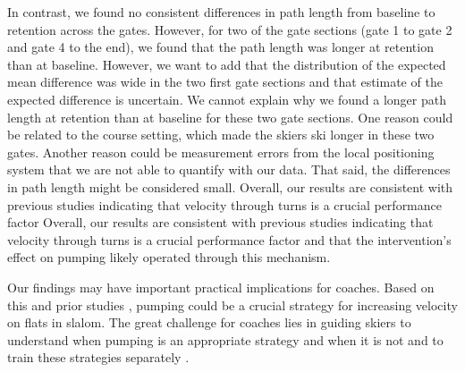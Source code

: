 \documentclass{article}
\begin{document}
In contrast, we found no consistent differences in path length from baseline to retention across the gates. However, for two of the gate sections (gate 1 to gate 2 and gate 4 to the end), we found that the path length was longer at retention than at baseline. However, we want to add that the distribution of the expected mean difference was wide in the two first gate sections and that estimate of the expected difference is uncertain. We cannot explain why we found a longer path length at retention than at baseline for these two gate sections. One reason could be related to the course setting, which made the skiers ski longer in these two gates. Another reason could be measurement errors from the local positioning system that we are not able to quantify with our data. That said, the differences in path length might be considered small. Overall, our results are consistent with previous studies indicating that velocity through turns is a crucial performance factor Overall, our results are consistent with previous studies indicating that velocity through turns is a crucial performance factor \cite{federolf_quantifying_2012, supej_differential_2008, sporri_turn_2012, lesnik_best_2007} and that the intervention's effect on pumping likely operated through this mechanism.

Our findings may have important practical implications for coaches. Based on this and prior studies \cite{christian_magelssen_reinforcement_2024}, pumping could be a crucial strategy for increasing velocity on flats in slalom. The great challenge for coaches lies in guiding skiers to understand when pumping is an appropriate strategy and when it is not and to train these strategies separately \cite{supej_impact_2015}. 
\end{document}
